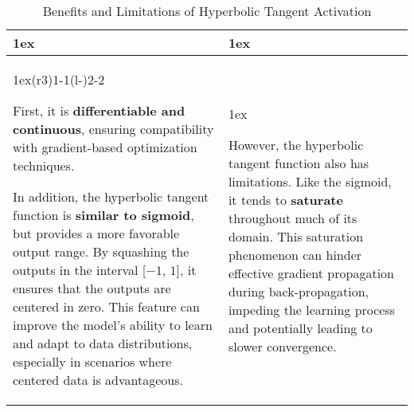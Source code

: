 \begin{table}[h]
\begin{tabularx}{\linewidth}{>{\parskip1ex}X@{\kern4\tabcolsep}>{\parskip1ex}X}
\toprule
\hfil\bfseries \color{myred}{Pros}
&
\hfil\bfseries \color{myred}{Cons}
\\\cmidrule(r{3\tabcolsep}){1-1}\cmidrule(l{-\tabcolsep}){2-2}

First, it is \textbf{\textcolor{myred}{differentiable and continuous}}, ensuring compatibility with gradient-based optimization techniques. 

In addition, the hyperbolic tangent function is \textbf{\textcolor{myred}{similar to sigmoid}}, but provides a more favorable output range. By squashing the outputs in the interval [$-1$, $1$], it ensures that the outputs are centered in zero. This feature can improve the model's ability to learn and adapt to data distributions, especially in scenarios where centered data is advantageous.
&

However, the hyperbolic tangent function also has limitations. Like the sigmoid, it tends to \textbf{\textcolor{myred}{saturate}} throughout much of its domain. This saturation phenomenon can hinder effective gradient propagation during back-propagation, impeding the learning process and potentially leading to slower convergence.
\\\bottomrule
\end{tabularx}
\caption{Benefits and Limitations of Hyperbolic Tangent Activation}
\end{table}

